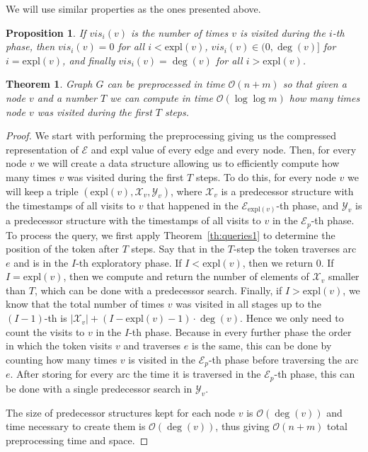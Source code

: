 \documentclass{article}[11pt,letter]
\newtheorem{theorem}[definition]{Theorem}
\newtheorem{proposition}[definition]{Proposition}
\newcommand{\bigo}{\mathcal{O}}
\newcommand{\expl}{\mathrm{expl}}
\newcommand{\walk}{\mathcal{E}}
\begin{document}
We will use similar properties as the ones presented above.
\begin{proposition}
If $vis_i(v)$ is the number of times $v$ is visited during the $i$-th phase, then
$vis_i(v) = 0$ for all $i < \expl(v)$, $vis_i(v)\in (0,\deg(v)]$ for $i = \expl(v)$, and finally $vis_i(v) = \deg(v)$ for all $i>\expl(v)$.
\end{proposition}
\begin{theorem}
Graph $G$ can be preprocessed in time $\bigo(n+m)$ so that given a node $v$ and a number $T$ we can compute in time $\bigo(\log \log m)$ how many times
node $v$ was visited during the first $T$ steps.
\end{theorem}
\begin{proof}
We start with performing the preprocessing giving us the compressed representation of $\walk$ and $\expl$ value of every edge and every node. Then, for every node $v$ we will create a data structure allowing us to efficiently compute how many times $v$ was visited during the first $T$ steps.
To do this, for every node $v$ we will keep a triple
$(\expl(v), \mathcal{X}_v,  \mathcal{Y}_v)$,
where $\mathcal{X}_v$ is a predecessor structure with the timestamps of all visits to $v$ that happened in the $\walk_{\expl(v)}$-th phase, and $\mathcal{Y}_v$ is a predecessor structure with the timestamps of all visits to $v$ in the $\walk_p$-th phase.
To process the query, we first apply Theorem~\ref{th:queries1} to determine the position of the token after $T$ steps. Say that in the $T$-step the token traverses arc $e$ and is in the $I$-th exploratory phase. If $I < \expl(v)$, then we return $0$. If $I = \expl(v)$, then we compute and return the number of elements of $\mathcal{X}_v$ smaller than $T$, which can be done with a predecessor search.
Finally, if $I > \expl(v)$, we know that the total number of times $v$ was visited in all stages up to the $(I-1)$-th is $|\mathcal{X}_v| + (I-\expl(v)-1)\cdot \deg(v)$.
Hence we only need to count the visits to $v$ in the $I$-th phase. Because in every further phase the order in which the token visits $v$ and traverses $e$ is the same,
this can be done by counting how many times $v$ is visited in the $\walk_p$-th phase before traversing the arc $e$. After storing for every arc the time it is traversed
in the $\walk_p$-th phase, this can be done with a single predecessor search in $\mathcal{Y}_v$.

The size of predecessor structures kept for each node $v$ is $\bigo(\deg(v))$ and time necessary to create them is $\bigo(\deg(v))$, thus giving $\bigo(n+m)$ total preprocessing time and space.

\end{proof}
\end{document}

